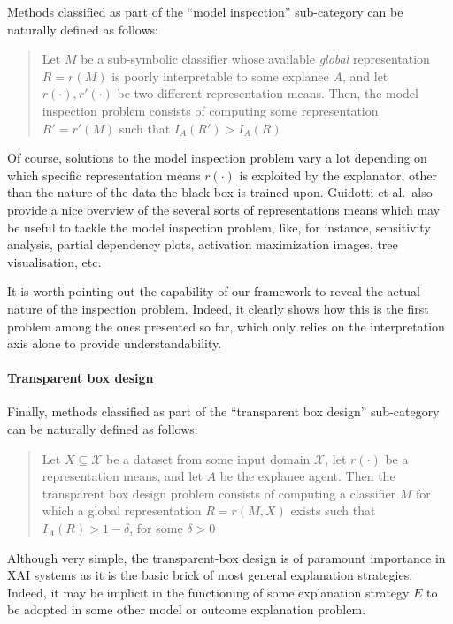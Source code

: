 \documentclass[12pt,a4paper,openright,twoside]{book}
\begin{document}
Methods classified as part of the ``model inspection'' sub-category can be naturally defined as follows:
%
\begin{quotation}
    Let $M$ be a sub-symbolic classifier whose available \emph{global} representation $R = r(M)$ is poorly interpretable to some explanee $A$, and let $r(\cdot), r'(\cdot)$ be two different representation means.
    Then, the model inspection problem consists of computing some representation $R' = r'(M)$ such that $I_A(R') > I_A(R)$
\end{quotation}
%
Of course, solutions to the model inspection problem vary a lot depending on which specific representation means $r(\cdot)$ is exploited by the explanator, other than the nature of the data the black box is trained upon.
%
Guidotti et al.\ also provide a nice overview of the several sorts of representations means which may be useful to tackle the model inspection problem, like, for instance, sensitivity analysis, partial dependency plots, activation maximization images, tree visualisation, etc.

It is worth pointing out the capability of our framework to reveal the actual nature of the inspection problem.
%
Indeed, it clearly shows how this is the first problem among the ones presented so far, which only relies on the interpretation axis alone to provide understandability.

\paragraph{Transparent box design}

Finally, methods classified as part of the ``transparent box design'' sub-category can be naturally defined as follows:
%
\begin{quotation}
    Let $X \subseteq \mathcal{X}$ be a dataset from some input domain $\mathcal{X}$, let $r(\cdot)$ be a representation means, and let $A$ be the explanee agent.
    Then the transparent box design problem consists of computing a classifier $M$ for which a global representation $R = r(M, X)$ exists such that $I_A(R) > 1 - \delta$, for some $\delta > 0$
\end{quotation}
%
Although very simple, the transparent-box design is of paramount importance in XAI systems as it is the basic brick of most general explanation strategies.
%
Indeed, it may be implicit in the functioning of some explanation strategy $E$ to be adopted in some other model or outcome explanation problem.
\end{document}
